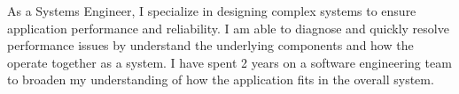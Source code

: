 

\begin{cvparagraph}

As a Systems Engineer,  I specialize in designing complex systems to ensure application performance and reliability.  I am able to diagnose and quickly resolve performance issues by understand the underlying components and how the operate together as a system.  I have spent 2 years on a software engineering team to broaden my understanding of how the application fits in the overall system.
\end{cvparagraph}

